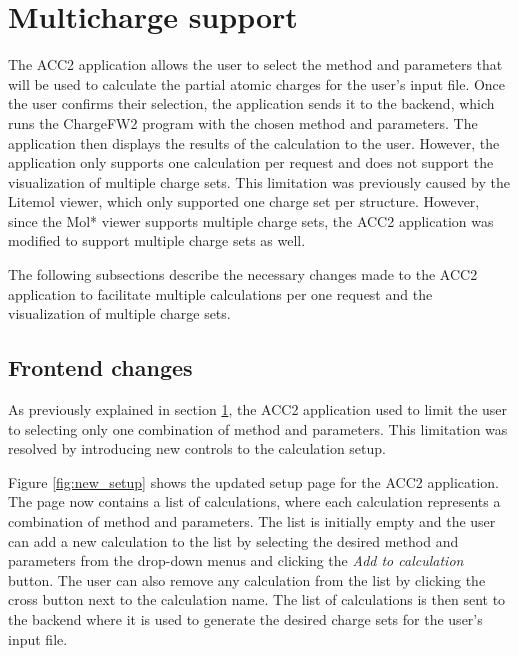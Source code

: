 \documentclass[
  digital,     %
  oneside,     %
  nosansbold,  %
  nocolorbold, %
  lof,         %
  lot,         %
]{fithesis4}
\begin{document}
\section{Multicharge support}
\label{section:multicharge_support}

The ACC2 application allows the user to select the method and parameters that will be used to calculate the partial atomic charges for the user's input file. Once the user confirms their selection, the application sends it to the backend, which runs the ChargeFW2 program with the chosen method and parameters. The application then displays the results of the calculation to the user. However, the application only supports one calculation per request and does not support the visualization of multiple charge sets. This limitation was previously caused by the Litemol viewer, which only supported one charge set per structure. However, since the Mol* viewer supports multiple charge sets, the ACC2 application was modified to support multiple charge sets as well.

The following subsections describe the necessary changes made to the ACC2 application to facilitate multiple calculations per one request and the visualization of multiple charge sets.

\subsection{Frontend changes}

As previously explained in section \ref{section:multicharge_support}, the ACC2 application used to limit the user to selecting only one combination of method and parameters. This limitation was resolved by introducing new controls to the calculation setup.

Figure \ref{fig:new_setup} shows the updated setup page for the ACC2 application. The page now contains a list of calculations, where each calculation represents a combination of method and parameters. The list is initially empty and the user can add a new calculation to the list by selecting the desired method and parameters from the drop-down menus and clicking the \textit{Add to calculation} button. The user can also remove any calculation from the list by clicking the cross button next to the calculation name. The list of calculations is then sent to the backend where it is used to generate the desired charge sets for the user's input file.
\end{document}
